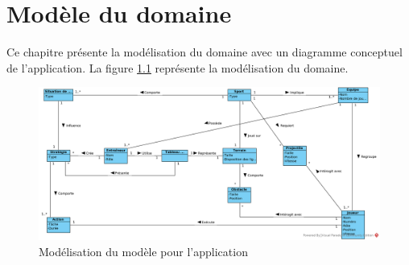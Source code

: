
\chapter{Modèle du domaine}
\label{s:modele_domaine}

Ce chapitre présente la modélisation du domaine avec un diagramme conceptuel de l'application.
La figure \ref{fig:conceptuel_diag} représente la modélisation du domaine.

\begin{figure}[htpb]
    \centering
    \includegraphics[scale=0.6]{fig/conceptuel_diag.png}
    \caption{Modélisation du modèle pour l'application}
    \label{fig:conceptuel_diag}
\end{figure}
